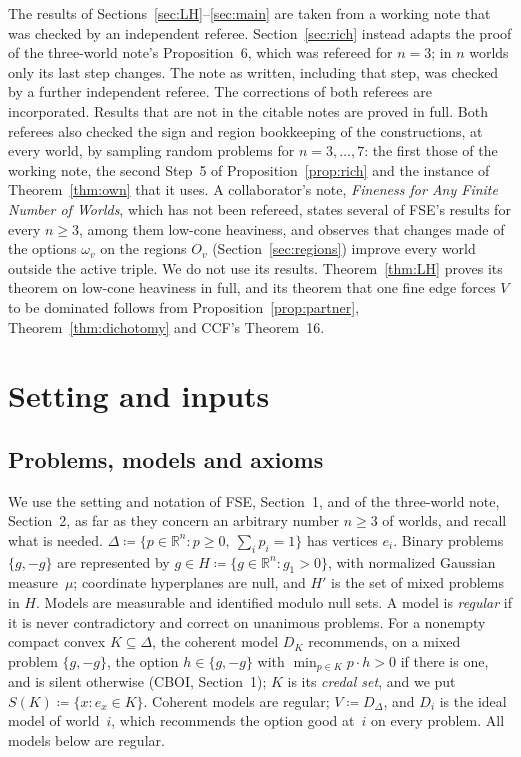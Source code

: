 \documentclass[11pt]{article}
\theoremstyle{definition}\newtheorem{definition}[theorem]{Definition}
\theoremstyle{remark}\newtheorem{remark}[theorem]{Remark}
\newcommand{\R}{\mathbb R}
\begin{document}
The results of Sections~\ref{sec:LH}--\ref{sec:main} are taken from a
working note that was checked by an independent referee.
Section~\ref{sec:rich} instead adapts the proof of the three-world note's
Proposition~6, which was refereed for $n=3$; in $n$ worlds only its last
step changes. The note as written, including that step, was checked by a
further independent referee. The corrections of both referees are
incorporated. Results that are not in the citable notes are proved in
full. Both referees also checked the sign and region bookkeeping of the
constructions, at every world, by sampling random problems for
$n=3,\dots,7$: the first those of the working note, the second Step~5 of
Proposition~\ref{prop:rich} and the instance of Theorem~\ref{thm:own}
that it uses. A collaborator's note, \emph{Fineness for Any Finite Number of Worlds}, which has not been
refereed, states several of FSE's results for every $n\ge3$, among them
low-cone heaviness, and observes that changes made of the options
$\omega_v$ on the regions $O_v$ (Section~\ref{sec:regions}) improve every
world outside the active triple. We do not use its results.
Theorem~\ref{thm:LH} proves its theorem on low-cone heaviness in full, and
its theorem that one fine edge forces $V$ to be dominated follows from
Proposition~\ref{prop:partner}, Theorem~\ref{thm:dichotomy} and CCF's
Theorem~16.

\section{Setting and inputs}\label{sec:setting}

\subsection{Problems, models and axioms}\label{sec:axioms}

We use the setting and notation of FSE, Section~1, and of the three-world
note, Section~2, as far as they concern an arbitrary number $n\ge3$ of
worlds, and recall what is needed. $\Delta\coloneqq\{p\in\R^n:p\ge0,\
\sum_ip_i=1\}$ has vertices $e_i$. Binary problems $\{g,-g\}$ are
represented by $g\in H\coloneqq\{g\in\R^n:g_1>0\}$, with normalized
Gaussian measure~$\mu$; coordinate hyperplanes are null, and $H'$ is the
set of mixed problems in $H$. Models are measurable and identified modulo
null sets. A model is \emph{regular} if it is never contradictory and
correct on unanimous problems. For a nonempty compact convex
$K\subseteq\Delta$, the coherent model $D_K$ recommends, on a mixed problem
$\{g,-g\}$, the option $h\in\{g,-g\}$ with $\min_{p\in K}p\cdot h>0$ if
there is one, and is silent otherwise (CBOI, Section~1); $K$ is its
\emph{credal set}, and we put $S(K)\coloneqq\{x:e_x\in K\}$. Coherent
models are regular; $V\coloneqq D_\Delta$, and $D_i$ is the ideal model of
world~$i$, which recommends the option good at~$i$ on every problem. All
models below are regular.
\end{document}
